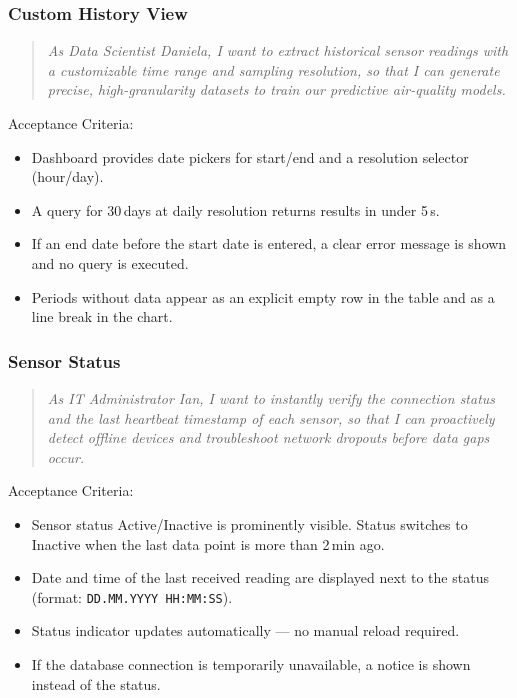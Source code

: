 \documentclass[conference,a4paper,flushend]{cs-techrep} %
\begin{document}
\medskip
\subsubsection{Custom History View}\label{sec:us_05}

\begin{quote}
    \textit{As Data Scientist Daniela, I want to extract historical sensor readings with a customizable time range and 
    sampling resolution, so that I can generate precise, high-granularity datasets to train our predictive air-quality models.}
\end{quote}

Acceptance Criteria:
\begin{itemize}
    \item Dashboard provides date pickers for start/end and a resolution selector (hour/day).
    \item A query for 30\,days at daily resolution returns results in under 5\,s.
    \item If an end date before the start date is entered, a clear error message is shown and no query is executed.
    \item Periods without data appear as an explicit empty row in the table and as a line break in the chart.
\end{itemize}

\medskip
\subsubsection{Sensor Status}\label{sec:us_06}

\begin{quote}
    \textit{As IT Administrator Ian, I want to instantly verify the connection status and the last heartbeat timestamp of 
    each sensor, so that I can proactively detect offline devices and troubleshoot network dropouts before data gaps occur.}
\end{quote}

Acceptance Criteria:
\begin{itemize}
    \item Sensor status Active/Inactive is prominently visible. Status switches to Inactive when the 
    last data point is more than 2\,min ago.
    \item Date and time of the last received reading are displayed next to the status (format: \texttt{DD.MM.YYYY HH:MM:SS}).
    \item Status indicator updates automatically — no manual reload required.
    \item If the database connection is temporarily unavailable, a notice is shown instead of the status.
\end{itemize}
\end{document}
